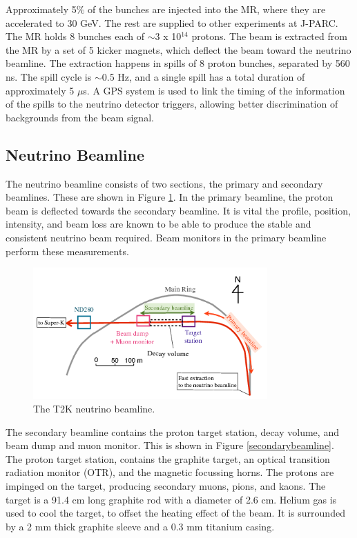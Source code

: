Approximately 5$\%$ of the bunches are injected into the MR, where they are accelerated to 30 GeV. The rest are supplied to other experiments at J-PARC. The MR holds 8 bunches each of $\sim$3 x 10$^{14}$ protons. The beam is extracted from the MR by a set of 5 kicker magnets, which deflect the beam toward the neutrino beamline. The extraction happens in spills of 8 proton bunches, separated by 560 ns. The spill cycle is $\sim$0.5 Hz, and a single spill has a total duration of approximately 5 $\mu$s. A GPS system is used to link the timing of the information of the spills to the neutrino detector triggers, allowing better discrimination of backgrounds from the beam signal.

\subsection{Neutrino Beamline}

The neutrino beamline consists of two sections, the primary and secondary beamlines. These are shown in Figure \ref{beamline}. In the primary beamline, the proton beam is deflected towards the secondary beamline. It is vital the profile, position, intensity, and beam loss are known to be able to produce the stable and consistent neutrino beam required. Beam monitors in the primary beamline perform these measurements. 

\begin{figure}[!htbp]
\centering
\includegraphics*[width=0.8\textwidth,clip]{figs/beamline}
\caption{The T2K neutrino beamline.} \label{beamline}
\end{figure}

The secondary beamline contains the proton target station, decay volume, and beam dump and muon monitor. This is shown in Figure \ref{secondarybeamline}. The proton target station, contains the graphite target, an optical transition radiation monitor (OTR), and the magnetic focussing horns. The protons are impinged on the target, producing secondary muons, pions, and kaons. The target is a 91.4 cm long graphite rod with a diameter of 2.6 cm. Helium gas is used to cool the target, to offset the heating effect of the beam. It is surrounded by a 2 mm thick graphite sleeve and a 0.3 mm titanium casing. 

